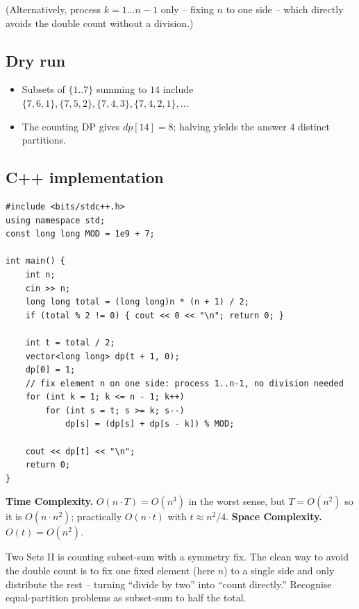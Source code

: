 (Alternatively, process $k=1\ldots n-1$ only -- fixing $n$ to one side --
which directly avoids the double count without a division.)

\subsection*{Dry run}


\begin{itemize}
  \item Subsets of $\{1..7\}$ summing to $14$ include $\{7,6,1\},
        \{7,5,2\},\{7,4,3\},\{7,4,2,1\},\ldots$
  \item The counting DP gives $\textit{dp}[14]=8$; halving yields the
        answer $4$ distinct partitions.
\end{itemize}

\subsection*{C++ implementation}

\begin{lstlisting}
#include <bits/stdc++.h>
using namespace std;
const long long MOD = 1e9 + 7;

int main() {
    int n;
    cin >> n;
    long long total = (long long)n * (n + 1) / 2;
    if (total % 2 != 0) { cout << 0 << "\n"; return 0; }

    int t = total / 2;
    vector<long long> dp(t + 1, 0);
    dp[0] = 1;
    // fix element n on one side: process 1..n-1, no division needed
    for (int k = 1; k <= n - 1; k++)
        for (int s = t; s >= k; s--)
            dp[s] = (dp[s] + dp[s - k]) % MOD;

    cout << dp[t] << "\n";
    return 0;
}
\end{lstlisting}

\begin{complexitybox}
\textbf{Time Complexity.} $O(n\cdot T)=O(n^3)$ in the worst sense, but
$T=O(n^2)$ so it is $O(n\cdot n^2)$; practically $O(n\cdot t)$ with
$t\approx n^2/4$. \textbf{Space Complexity.} $O(t)=O(n^2)$.
\end{complexitybox}

\begin{takeawaybox}
Two Sets II is counting subset-sum with a symmetry fix. The clean way to
avoid the double count is to fix one fixed element (here $n$) to a single
side and only distribute the rest -- turning ``divide by two'' into ``count
directly.'' Recognise equal-partition problems as subset-sum to half the
total.
\end{takeawaybox}
